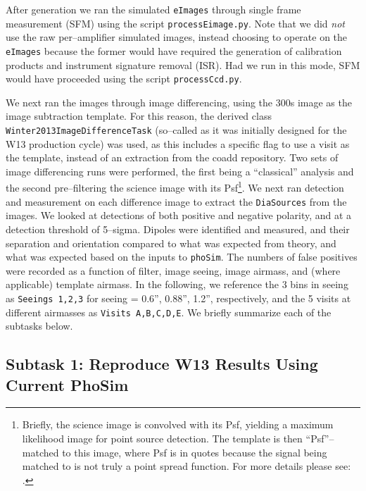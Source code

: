 \documentclass[DM,toc]{lsstdoc}
\begin{document}
After generation we ran the simulated {\tt eImages} through single
frame measurement (SFM) using the script {\tt processEimage.py}.  Note
that we did {\it not} use the raw per--amplifier simulated images,
instead choosing to operate on the {\tt eImages} because the former
would have required the generation of calibration products and
instrument signature removal (ISR).  Had we run in this mode, SFM
would have proceeded using the script {\tt processCcd.py}.

We next ran the images through image differencing, using the 300s
image as the image subtraction template.  For this reason, the derived
class {\tt Winter2013ImageDifferenceTask} (so--called as it was
initially designed for the W13 production cycle) was used, as this
includes a specific flag to use a visit as the template, instead of an
extraction from the coadd repository.  Two sets of image differencing
runs were performed, the first being a ``classical'' analysis and the
second pre--filtering the science image with its Psf\footnote{Briefly,
  the science image is convolved with its Psf, yielding a maximum
  likelihood image for point source detection.  The template is then
  ``Psf''--matched to this image, where Psf is in quotes because the
  signal being matched to is not truly a point spread function.  For
  more details please see: .}.
We next ran detection and measurement on each difference image to
extract the {\tt DiaSources} from the images.  We looked at detections
of both positive and negative polarity, and at a detection threshold
of 5--sigma.  Dipoles were identified and measured, and their
separation and orientation compared to what was expected from theory,
and what was expected based on the inputs to {\tt phoSim}.  The
numbers of false positives were recorded as a function of filter,
image seeing, image airmass, and (where applicable) template airmass.
In the following, we reference the 3 bins in seeing as {\tt Seeings
  1,2,3} for seeing = 0.6'', 0.88'', 1.2'', respectively, and the 5
visits at different airmasses as {\tt Visits A,B,C,D,E}.  We briefly
summarize each of the subtasks below.

\subsection{Subtask 1: Reproduce W13 Results Using Current PhoSim}
\end{document}
